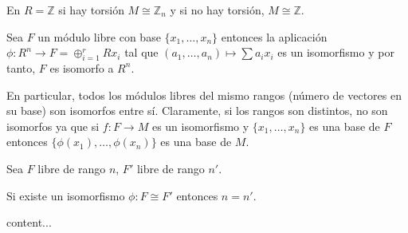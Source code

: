 \begin{example}
En $R = \mathbb{Z}$ si hay torsión $M \cong \mathbb{Z}_n$ y si no hay torsión, $M \cong \mathbb{Z}$.
\end{example}

\begin{proposition}
Sea $F$ un módulo libre con base $\{x_1,\ldots, x_n\}$ entonces la aplicación $\phi:R^n \to F = \oplus_{i = 1}^r  Rx_i$ tal que $(a_1,\ldots,a_n) \mapsto \sum a_ix_i$ es un isomorfismo y por tanto, $F$ es isomorfo a $R^n$. 

En particular, todos los módulos libres del mismo rangos (número de vectores en su base) son isomorfos entre sí. Claramente, si los rangos son distintos, no son isomorfos ya que si $f:F \to M$ es un isomorfismo y $\{x_1,\ldots,x_n \}$ es una base de $F$ entonces $\{\phi(x_1),\ldots,\phi(x_n) \}$ es una base de $M$.
\end{proposition}

\begin{corollary}
Sea $F$ libre de rango $n$, $F'$ libre de rango $n'$. 

Si existe un isomorfismo $\phi:F \cong F'$ entonces $n = n'$. 
\end{corollary}

\begin{theorem}
content...
\end{theorem}









